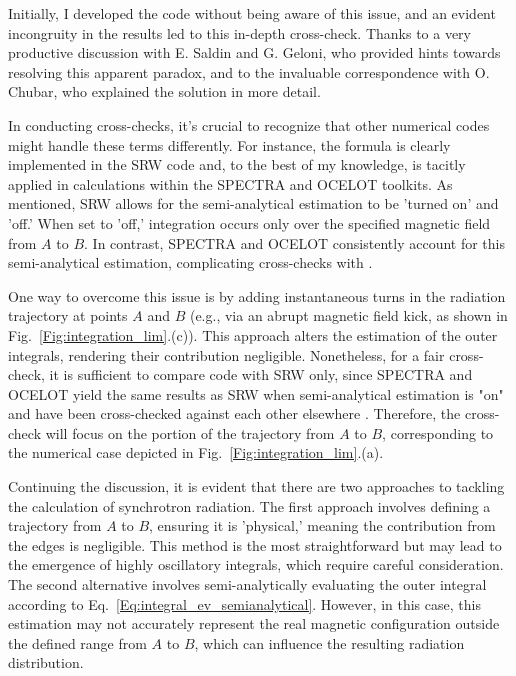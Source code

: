     Initially, I developed the code without being aware of this issue, and an evident incongruity in the results led to this in-depth cross-check. Thanks to a very productive discussion with E. Saldin and G. Geloni, who provided hints towards resolving this apparent paradox, and to the invaluable correspondence with O. Chubar, who explained the solution in more detail.
    
    In conducting cross-checks, it's crucial to recognize that other numerical codes might handle these terms differently. For instance, the formula is clearly implemented in the SRW code and, to the best of my knowledge, is tacitly applied in calculations within the SPECTRA and OCELOT toolkits. As mentioned, SRW allows for the semi-analytical estimation to be 'turned on' and 'off.' When set to 'off,' integration occurs only over the specified magnetic field from $A$ to $B$. In contrast, SPECTRA and OCELOT consistently account for this semi-analytical estimation, complicating cross-checks with .~
    
    One way to overcome this issue is by adding instantaneous turns in the radiation trajectory at points $A$ and $B$ (e.g., via an abrupt magnetic field kick, as shown in Fig.~\ref{Fig:integration_lim}.(c)). This approach alters the estimation of the outer integrals, rendering their contribution negligible. Nonetheless, for a fair cross-check, it is sufficient to compare  code with SRW only, since SPECTRA and OCELOT yield the same results as SRW when semi-analytical estimation is "on" and have been cross-checked against each other elsewhere . Therefore, the cross-check will focus on the portion of the trajectory from $A$ to $B$, corresponding to the numerical case depicted in Fig.~\ref{Fig:integration_lim}.(a).
    
    Continuing the discussion, it is evident that there are two approaches to tackling the calculation of synchrotron radiation. The first approach involves defining a trajectory from $A$ to $B$, ensuring it is 'physical,' meaning the contribution from the edges is negligible. This method is the most straightforward but may lead to the emergence of highly oscillatory integrals, which require careful consideration. The second alternative involves semi-analytically evaluating the outer integral according to Eq.~\ref{Eq:integral_ev_semianalytical}. However, in this case, this estimation may not accurately represent the real magnetic configuration outside the defined range from $A$ to $B$, which can influence the resulting radiation distribution.

